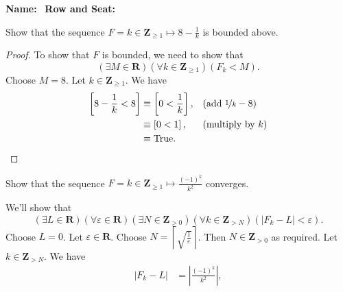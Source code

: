 \documentclass[12pt, fleqn, answers]{exam}
\newcommand{\reals}{\mathbf{R}}
\newcommand{\integers}{\mathbf{Z}}
\newcommand{\True}{\mathrm{True}}
\begin{document}
\large
\vspace{0.1in}
\noindent{}
{\bf Name:}\hrulefill\
\noindent {}
{\bf Row and Seat:}\hrulefill\

\vspace{0.1in}

\small
\normalsize
\begin{questions}

\question Show that the sequence $F = k \in \integers_{\geq 1} \mapsto 8 - \frac{1}{k}$ is
bounded above.
\begin{solution} 
  \begin{proof}
  To show that $F$ is bounded, we need to show that 
  \begin{equation*}
     \left(\exists M \in \reals\right)
     \left(\forall k \in \integers_{\geq 1} \right)
     \left(F_k < M\right).
  \end{equation*}
  Choose $M = 8$. Let $k \in \integers_{\geq 1} $. We have
\begin{align*}
 \left[ 8 - \frac{1}{k} < 8 \right] &\equiv \left[  0 <  \frac{1}{k} \right], && \mbox{(add $ \nicefrac{1}{k} -8$)} \\
                                               & \equiv \left[  0 < 1 \right], && \mbox{(multiply by $k$)} \\
  &\equiv \True. \qedhere
\end{align*}
\end{proof}
\end{solution}
\question Show that the sequence $F = k \in \integers_{\geq 1} \mapsto \frac{(-1)^k}{k^2}$ converges.
\begin{solution} We'll show that
\begin{equation*}
 \left(\exists L \in \reals \right)
 \left(\forall \varepsilon \in \reals\right)
 \left(\exists N \in \integers_{>0}\right)
 \left(\forall k \in \integers_{>N} \right)
 \left(|F_k - L | < \varepsilon\right).
\end{equation*}
Choose $L = 0$. Let  $\varepsilon \in \reals$. Choose $N =  \left \lceil 
\sqrt{\frac{1}{\varepsilon}} \right \rceil $. 
Then $N \in \integers_{>0}$ as required.  Let $k \in \integers_{> N}$. We have
\begin{align*}
   |F_k -L | &= \left|\frac{(-1)^k}{k^2} \right|, \\

\end{align*}
\end{solution}
\end{questions}
\end{document}
